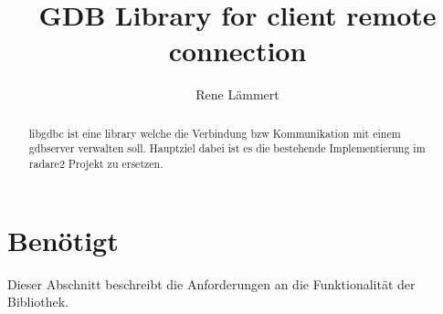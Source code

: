 \documentclass{article}
\begin{document}
\title{GDB Library for client remote connection}
\author{Rene L\"ammert}

\maketitle

\begin{abstract}
libgdbc ist eine library welche die Verbindung bzw Kommunikation mit einem gdbserver verwalten soll.
Hauptziel dabei ist es die bestehende Implementierung im radare2 Projekt zu ersetzen.
\end{abstract}

\section{Ben\"otigt}
Dieser Abschnitt beschreibt die Anforderungen an die Funktionalit\"at der Bibliothek.
\end{document}
